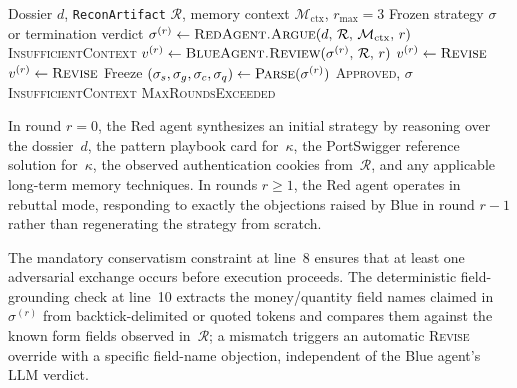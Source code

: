 \begin{algorithm}[htbp]
\caption{Adversarial Debate Protocol}
\label{alg:debate}
\begin{algorithmic}[1]
\Require Dossier $d$, \texttt{ReconArtifact} $\mathcal{R}$,
         memory context $\mathcal{M}_{\mathrm{ctx}}$,
         $r_{\max} = 3$
\Ensure Frozen strategy $\sigma$ or termination verdict
  \State $\sigma^{(r)} \gets \textsc{RedAgent.Argue}(d,\, \mathcal{R},\,
         \mathcal{M}_{\mathrm{ctx}},\, r)$
    \State \Return \textsc{InsufficientContext}
  \EndIf
  \State $v^{(r)} \gets \textsc{BlueAgent.Review}(\sigma^{(r)},\, \mathcal{R},\, r)$
    \State $v^{(r)} \gets \textsc{Revise}$ 
  \EndIf
    \State $v^{(r)} \gets \textsc{Revise}$ 
  \EndIf
    \State Freeze $(\sigma_s, \sigma_g, \sigma_c, \sigma_q) \gets \textsc{Parse}(\sigma^{(r)})$
    \State \Return \textsc{Approved}, $\sigma$
    \State \Return \textsc{InsufficientContext}
  \EndIf
\EndFor
\State \Return \textsc{MaxRoundsExceeded}
\end{algorithmic}
\end{algorithm}

In round $r = 0$, the Red agent synthesizes an initial strategy by
reasoning over the dossier~$d$, the pattern playbook card for~$\kappa$,
the PortSwigger reference solution for~$\kappa$, the observed
authentication cookies from~$\mathcal{R}$, and any applicable
long-term memory techniques.
In rounds $r \geq 1$, the Red agent operates in rebuttal mode,
responding to exactly the objections raised by Blue in round $r-1$
rather than regenerating the strategy from scratch.

The mandatory conservatism constraint at line~8 ensures that at least
one adversarial exchange occurs before execution proceeds.
The deterministic field-grounding check at line~10 extracts the
money/quantity field names claimed in $\sigma^{(r)}$ from
backtick-delimited or quoted tokens and compares them against the known
form fields observed in~$\mathcal{R}$; a mismatch triggers an automatic
\textsc{Revise} override with a specific field-name objection,
independent of the Blue agent's LLM verdict.


